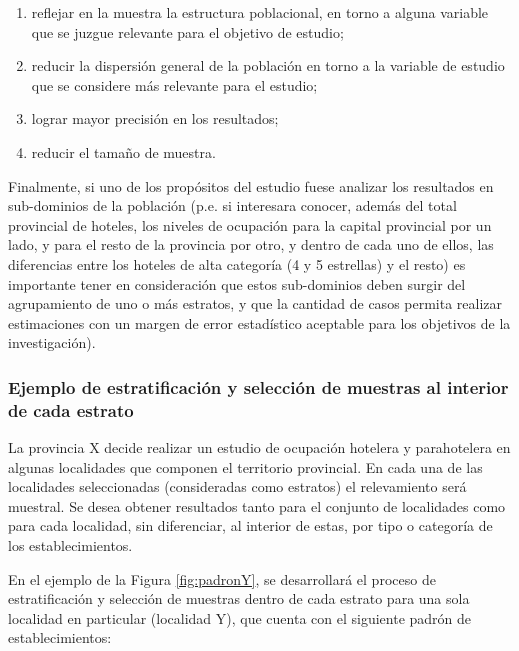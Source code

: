 \documentclass[
]{book}
\begin{document}
\begin{enumerate}
\def\labelenumi{\alph{enumi})}
\item
  reflejar en la muestra la estructura poblacional, en torno a alguna variable que se juzgue relevante para el objetivo de estudio;
\item
  reducir la dispersión general de la población en torno a la variable de estudio que se considere más relevante para el estudio;
\item
  lograr mayor precisión en los resultados;
\item
  reducir el tamaño de muestra.
\end{enumerate}

Finalmente, si uno de los propósitos del estudio fuese analizar los resultados en sub-dominios de la población (p.e. si interesara conocer, además del total provincial de hoteles, los niveles de ocupación para la capital provincial por un lado, y para el resto de la provincia por otro, y dentro de cada uno de ellos, las diferencias entre los hoteles de alta categoría (4 y 5 estrellas) y el resto) es importante tener en consideración que estos sub-dominios deben surgir del agrupamiento de uno o más estratos, y que la cantidad de casos permita realizar estimaciones con un margen de error estadístico aceptable para los objetivos de la investigación).

\hypertarget{ejemplo-de-estratificaciuxf3n-y-selecciuxf3n-de-muestras-al-interior-de-cada-estrato}{%
\subsubsection{Ejemplo de estratificación y selección de muestras al interior de cada estrato}\label{ejemplo-de-estratificaciuxf3n-y-selecciuxf3n-de-muestras-al-interior-de-cada-estrato}}

La provincia X decide realizar un estudio de ocupación hotelera y parahotelera en algunas localidades que componen el territorio provincial. En cada una de las localidades seleccionadas (consideradas como estratos) el relevamiento será muestral. Se desea obtener resultados tanto para el conjunto de localidades como para cada localidad, sin diferenciar, al interior de estas, por tipo o categoría de los establecimientos.

En el ejemplo de la Figura \ref{fig:padronY}, se desarrollará el proceso de estratificación y selección de muestras dentro de cada estrato para una sola localidad en particular (localidad Y), que cuenta con el siguiente padrón de establecimientos:
\end{document}
